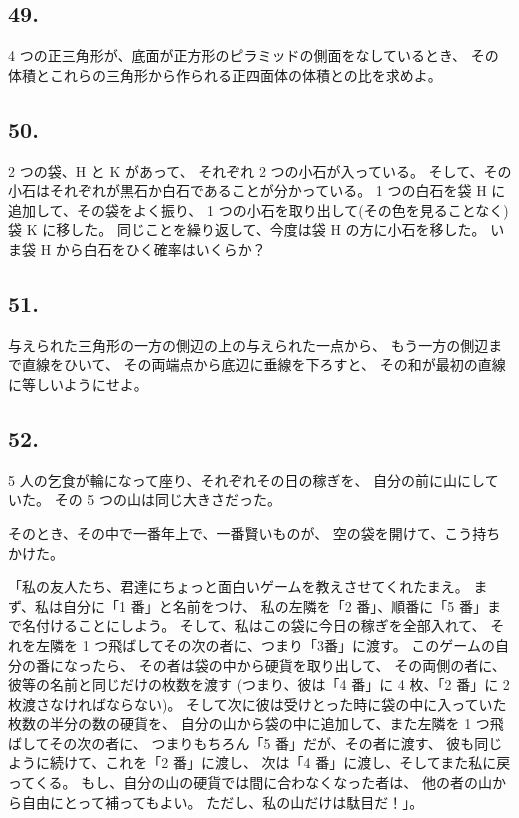 \begin{flushright}
[9/2/81]
\end{flushright}

\subsection*{49.}

 4 つの正三角形が、底面が正方形のピラミッドの側面をなしているとき、
その体積とこれらの三角形から作られる正四面体の体積との比を求めよ。

\begin{flushright}
[16/11/86]
\end{flushright}

\subsection*{50.}

 2 つの袋、H と K があって、
それぞれ 2 つの小石が入っている。
そして、その小石はそれぞれが黒石か白石であることが分かっている。
 1 つの白石を袋 H に追加して、その袋をよく振り、
 1 つの小石を取り出して(その色を見ることなく)袋 K に移した。
同じことを繰り返して、今度は袋 H の方に小石を移した。
いま袋 H から白石をひく確率はいくらか？

\subsection*{51.}

与えられた三角形の一方の側辺の上の与えられた一点から、
もう一方の側辺まで直線をひいて、
その両端点から底辺に垂線を下ろすと、
その和が最初の直線に等しいようにせよ。

\begin{flushright}
[12/81]
\end{flushright}

\subsection*{52.}

5 人の乞食が輪になって座り、それぞれその日の稼ぎを、
自分の前に山にしていた。
その 5 つの山は同じ大きさだった。

そのとき、その中で一番年上で、一番賢いものが、
空の袋を開けて、こう持ちかけた。

「私の友人たち、君達にちょっと面白いゲームを教えさせてくれたまえ。
まず、私は自分に「1 番」と名前をつけ、
私の左隣を「2 番」、順番に「5 番」まで名付けることにしよう。
そして、私はこの袋に今日の稼ぎを全部入れて、
それを左隣を 1 つ飛ばしてその次の者に、つまり「3番」に渡す。
このゲームの自分の番になったら、
その者は袋の中から硬貨を取り出して、
その両側の者に、彼等の名前と同じだけの枚数を渡す
(つまり、彼は「4 番」に 4 枚、「2 番」に 2 枚渡さなければならない)。
そして次に彼は受けとった時に袋の中に入っていた枚数の半分の数の硬貨を、
自分の山から袋の中に追加して、また左隣を 1 つ飛ばしてその次の者に、
つまりもちろん「5 番」だが、その者に渡す、
彼も同じように続けて、これを「2 番」に渡し、
次は「4 番」に渡し、そしてまた私に戻ってくる。
もし、自分の山の硬貨では間に合わなくなった者は、
他の者の山から自由にとって補ってもよい。
ただし、私の山だけは駄目だ！」。

